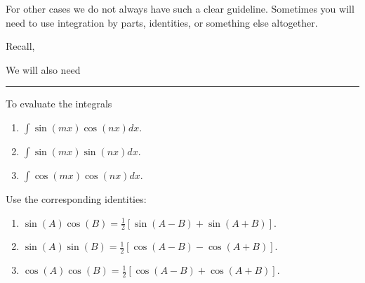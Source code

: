 \documentclass[reqno]{amsart}
\newcommand*\widefbox[1]{\fbox{\hspace{1em}#1\hspace{1em}}}
\numberwithin{equation}{section}
\begin{document}
For other cases we do not always have such a clear guideline. Sometimes you will need to use integration by parts, identities, or something else altogether.

Recall,

We will also need

\hrule
\vspace{1pc}

To evaluate the integrals
\begin{center}
\begin{enumerate}
\item $\int \sin(mx) \cos(nx) dx$.
\item $\int \sin(mx) \sin(nx) dx$.
\item $\int \cos(mx) \cos(nx) dx$.
\end{enumerate}
\end{center}

Use the corresponding identities:
\begin{center}
\begin{enumerate}
\item $\sin(A)\cos(B)=\frac{1}{2}[\sin(A-B)+\sin(A+B)]$.
\item $\sin(A)\sin(B)=[\cos(A-B)-\cos(A+B)]$.
\item $\cos(A)\cos(B)=[\cos(A-B)+\cos(A+B)]$.
\end{enumerate}
\end{center}
\end{document}
